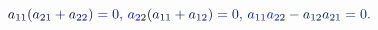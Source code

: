\documentclass[12pt]{article}
\begin{document}
\makeatletter
\renewcommand*{\@textcolor}[3]{%
  \protect\leavevmode
  \begingroup
    \color#1{#2}#3%
  \endgroup
}
\makeatother
\begin{displaymath}
\mathcolor[RGB]{0,0,15}{a} _ { \mathcolor[RGB]{0,0,30}{1} \mathcolor[RGB]{0,0,45}{1} } \mathcolor[RGB]{0,0,60}{(} \mathcolor[RGB]{0,0,75}{a} _ { \mathcolor[RGB]{0,0,90}{2} \mathcolor[RGB]{0,0,105}{1} } \mathcolor[RGB]{0,0,120}{+} \mathcolor[RGB]{0,0,135}{a} _ { \mathcolor[RGB]{0,0,150}{2} \mathcolor[RGB]{0,0,165}{2} } \mathcolor[RGB]{0,0,180}{)} \mathcolor[RGB]{0,0,195}{=} \mathcolor[RGB]{0,0,210}{0} \mathcolor[RGB]{0,0,225}{,} \mathcolor[RGB]{0,0,240}{\,
a} _ { \mathcolor[RGB]{0,0,255}{2} \mathcolor[RGB]{0,15,0}{2} } \mathcolor[RGB]{0,15,15}{(} \mathcolor[RGB]{0,15,30}{a} _ { \mathcolor[RGB]{0,15,45}{1} \mathcolor[RGB]{0,15,60}{1} } \mathcolor[RGB]{0,15,75}{+} \mathcolor[RGB]{0,15,90}{a} _ { \mathcolor[RGB]{0,15,105}{1} \mathcolor[RGB]{0,15,120}{2} } \mathcolor[RGB]{0,15,135}{)} \mathcolor[RGB]{0,15,150}{=} \mathcolor[RGB]{0,15,165}{0} \mathcolor[RGB]{0,15,180}{,} \mathcolor[RGB]{0,15,195}{\,
a} _ { \mathcolor[RGB]{0,15,210}{1} \mathcolor[RGB]{0,15,225}{1} } \mathcolor[RGB]{0,15,240}{a} _ { \mathcolor[RGB]{0,15,255}{2} \mathcolor[RGB]{0,30,0}{2} } \mathcolor[RGB]{0,30,15}{-} \mathcolor[RGB]{0,30,30}{a} _ { \mathcolor[RGB]{0,30,45}{1} \mathcolor[RGB]{0,30,60}{2} } \mathcolor[RGB]{0,30,75}{a} _ { \mathcolor[RGB]{0,30,90}{2} \mathcolor[RGB]{0,30,105}{1} } \mathcolor[RGB]{0,30,120}{=} \mathcolor[RGB]{0,30,135}{0} \mathcolor[RGB]{0,30,150}{.}
\end{displaymath}
\end{document}
